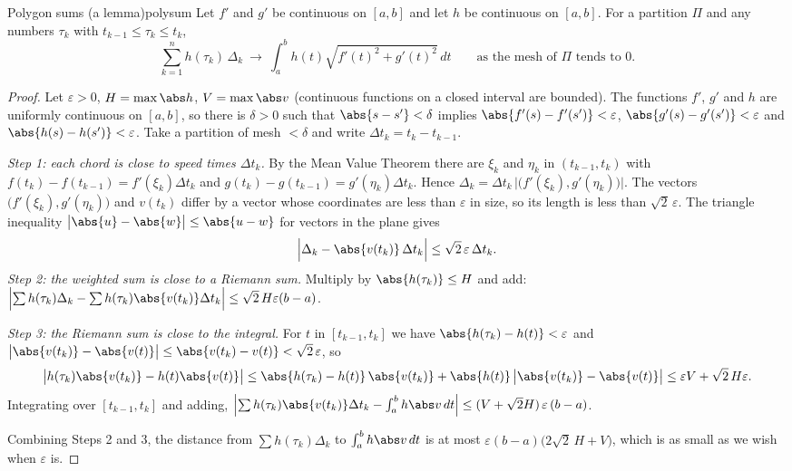 \documentclass[11pt]{article}
\begin{document}
\begin{thm}{Polygon sums (a lemma)}{polysum}
Let $f'$ and $g'$ be continuous on $[a,b]$ and let $h$ be continuous on $[a,b]$. For a partition $\Pi$ and any numbers $\tau_k$ with $t_{k-1}\le\tau_k\le t_k$,
\[
\sum_{k=1}^n h(\tau_k)\,\Delta_k\ \longrightarrow\ \int_a^b h(t)\sqrt{f'(t)^2+g'(t)^2}\,dt\qquad\text{as the mesh of $\Pi$ tends to $0$.}
\]
\end{thm}
\begin{proof}
Let $\varepsilon>0$, $H=\max\abs h$, $V=\max\abs v$ (continuous functions on a closed interval are bounded). The functions $f'$, $g'$ and $h$ are uniformly continuous on $[a,b]$, so there is $\delta>0$ such that $\abs{s-s'}<\delta$ implies $\abs{f'(s)-f'(s')}<\varepsilon$, $\abs{g'(s)-g'(s')}<\varepsilon$ and $\abs{h(s)-h(s')}<\varepsilon$. Take a partition of mesh $<\delta$ and write $\Delta t_k=t_k-t_{k-1}$.

\emph{Step 1: each chord is close to speed times $\Delta t_k$.} By the Mean Value Theorem there are $\xi_k$ and $\eta_k$ in $(t_{k-1},t_k)$ with $f(t_k)-f(t_{k-1})=f'(\xi_k)\Delta t_k$ and $g(t_k)-g(t_{k-1})=g'(\eta_k)\Delta t_k$. Hence $\Delta_k=\Delta t_k\,\bigl|\bigl(f'(\xi_k),g'(\eta_k)\bigr)\bigr|$. The vectors $\bigl(f'(\xi_k),g'(\eta_k)\bigr)$ and $v(t_k)$ differ by a vector whose coordinates are less than $\varepsilon$ in size, so its length is less than $\sqrt2\,\varepsilon$. The triangle inequality $\bigl|\abs{u}-\abs{w}\bigr|\le\abs{u-w}$ for vectors in the plane gives
\[
\Bigl|\Delta_k-\abs{v(t_k)}\,\Delta t_k\Bigr|\le\sqrt2\,\varepsilon\,\Delta t_k.
\]
\emph{Step 2: the weighted sum is close to a Riemann sum.} Multiply by $\abs{h(\tau_k)}\le H$ and add: $\Bigl|\sum h(\tau_k)\Delta_k-\sum h(\tau_k)\abs{v(t_k)}\Delta t_k\Bigr|\le\sqrt2\,H\varepsilon(b-a)$.

\emph{Step 3: the Riemann sum is close to the integral.} For $t$ in $[t_{k-1},t_k]$ we have $\abs{h(\tau_k)-h(t)}<\varepsilon$ and $\bigl|\abs{v(t_k)}-\abs{v(t)}\bigr|\le\abs{v(t_k)-v(t)}<\sqrt2\,\varepsilon$, so
\[
\bigl|h(\tau_k)\abs{v(t_k)}-h(t)\abs{v(t)}\bigr|\le\abs{h(\tau_k)-h(t)}\,\abs{v(t_k)}+\abs{h(t)}\,\bigl|\abs{v(t_k)}-\abs{v(t)}\bigr|\le\varepsilon V+\sqrt2\,H\varepsilon.
\]
Integrating over $[t_{k-1},t_k]$ and adding, $\Bigl|\sum h(\tau_k)\abs{v(t_k)}\Delta t_k-\int_a^bh\abs v\,dt\Bigr|\le(V+\sqrt2H)\,\varepsilon\,(b-a)$.

Combining Steps 2 and 3, the distance from $\sum h(\tau_k)\Delta_k$ to $\int_a^bh\abs v\,dt$ is at most $\varepsilon(b-a)\bigl(2\sqrt2\,H+V\bigr)$, which is as small as we wish when $\varepsilon$ is.
\end{proof}
\end{document}
